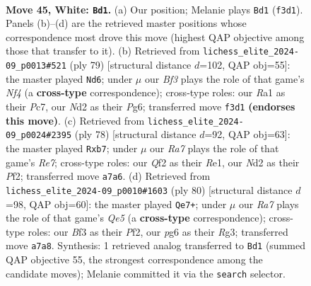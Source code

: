 \documentclass[11pt]{article}
\begin{document}
\clearpage

\begin{figure}[p]\centering
\begin{subfigure}{0.46\textwidth}\centering
\resizebox{\linewidth}{!}{%
\newchessgame
\chessboard[
  setfen={1r2r3/Rbq2p1k/1p3Bp1/8/7P/1P3B2/2PN1Q2/R5K1 w - - 3 45},
  showmover=false,
  pgfstyle=straightmove, color=movearrow, markmove={f3-d1}
]}
\caption{}
\end{subfigure}\hfill
\begin{subfigure}{0.46\textwidth}\centering
\resizebox{\linewidth}{!}{%
\newchessgame
\chessboard[
  setfen={4q2k/2p1r3/1p2B1p1/r4n1p/4R3/6P1/4QP1P/4R1K1 b - - 4 40},
  showmover=false,
  pgfstyle=straightmove, color=movearrow, markmove={f5-d6}
]}
\caption{}
\end{subfigure}
\\[4pt]
\begin{subfigure}{0.46\textwidth}\centering
\resizebox{\linewidth}{!}{%
\newchessgame
\chessboard[
  setfen={2r1B1k1/1p2Rbq1/5rp1/5p1p/8/Q6P/5PP1/4R1K1 w - - 8 40},
  showmover=false,
  pgfstyle=straightmove, color=movearrow, markmove={e7-b7}
]}
\caption{}
\end{subfigure}\hfill
\begin{subfigure}{0.46\textwidth}\centering
\resizebox{\linewidth}{!}{%
\newchessgame
\chessboard[
  setfen={8/2q3kp/1p1r1rb1/4Q3/P1B5/6RP/5PP1/4R1K1 w - - 7 41},
  showmover=false,
  pgfstyle=straightmove, color=movearrow, markmove={e5-e7}
]}
\caption{}
\end{subfigure}
\caption{\textbf{Move 45, White: \texttt{Bd1}.} (a) Our position; Melanie plays \texttt{Bd1} (\texttt{f3d1}). Panels (b)--(d) are the retrieved master positions whose correspondence most drove this move (highest QAP objective among those that transfer to it). (b) Retrieved from \texttt{lichess\_elite\_2024-09\_p0013\#521} (ply 79) [structural distance $d$=102, QAP obj=55]: the master played \texttt{Nd6}; under $\mu$ our \emph{Bf3} plays the role of that game's \emph{Nf4} (a \textbf{cross-type} correspondence); cross-type roles: our \emph{R}a1 as their \emph{P}c7, our \emph{N}d2 as their \emph{P}g6; transferred move \texttt{f3d1} \textbf{(endorses this move)}. (c) Retrieved from \texttt{lichess\_elite\_2024-09\_p0024\#2395} (ply 78) [structural distance $d$=92, QAP obj=63]: the master played \texttt{Rxb7}; under $\mu$ our \emph{Ra7} plays the role of that game's \emph{Re7}; cross-type roles: our \emph{Q}f2 as their \emph{R}e1, our \emph{N}d2 as their \emph{P}f2; transferred move \texttt{a7a6}. (d) Retrieved from \texttt{lichess\_elite\_2024-09\_p0010\#1603} (ply 80) [structural distance $d$=98, QAP obj=60]: the master played \texttt{Qe7+}; under $\mu$ our \emph{Ra7} plays the role of that game's \emph{Qe5} (a \textbf{cross-type} correspondence); cross-type roles: our \emph{B}f3 as their \emph{P}f2, our \emph{p}g6 as their \emph{R}g3; transferred move \texttt{a7a8}. Synthesis: 1 retrieved analog transferred to \texttt{Bd1} (summed QAP objective 55, the strongest correspondence among the candidate moves); Melanie committed it via the \texttt{search} selector.}
\label{fig:thought-m88}
\end{figure}
\end{document}
